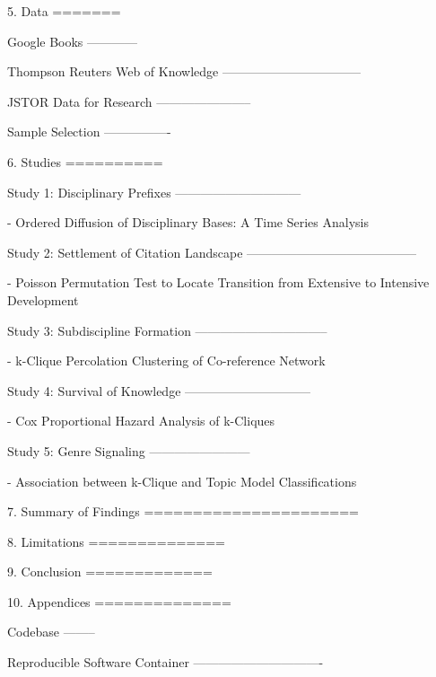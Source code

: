 5. Data
=======

Google Books
------------

Thompson Reuters Web of Knowledge
---------------------------------

JSTOR Data for Research
-----------------------

Sample Selection
----------------

6. Studies
==========

Study 1: Disciplinary Prefixes
------------------------------

-  Ordered Diffusion of Disciplinary Bases: A Time Series Analysis

Study 2: Settlement of Citation Landscape
-----------------------------------------

-  Poisson Permutation Test to Locate Transition from Extensive to
   Intensive Development

Study 3: Subdiscipline Formation
--------------------------------

-  k-Clique Percolation Clustering of Co-reference Network

Study 4: Survival of Knowledge
------------------------------

-  Cox Proportional Hazard Analysis of k-Cliques

Study 5: Genre Signaling
------------------------

-  Association between k-Clique and Topic Model Classifications

7. Summary of Findings
======================

8. Limitations
==============

9. Conclusion
=============

10. Appendices
==============

Codebase
--------

Reproducible Software Container
-------------------------------
